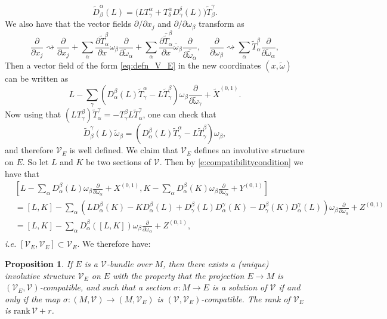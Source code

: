 \documentclass[11pt]{amsart}
\newcommand{\crb}{\mathcal{V}}
\newcommand{\dop}[1]{\frac{\partial}{\partial #1}}
\newcommand{\dopt}[2]{\frac{\partial #1}{\partial #2}}
\theoremstyle{definition}
\theoremstyle{remark}
\theoremstyle{plain}
\newtheorem{prop}[defn]{Proposition}
\begin{document}
%
\[\tilde{D}_\beta^\alpha(L) = \big( LT_\gamma^\alpha + T_\delta^\alpha D_\gamma^{\delta}(L)\big) \tilde{T}_\beta^\gamma.\]
%
We also have that the vector fields $\partial/\partial x_j$ and $\partial/\partial \omega_\beta$ transform as
%
\[\dop{x_j} \rightsquigarrow \dop{x_j}  + \sum_\alpha\dopt{{\tilde T}_{\alpha}^\beta}{x} \omega_\beta \dop{{\tilde \omega}_\alpha} +  \sum_\alpha\dopt{{\bar{\tilde T}}_{\alpha}^\beta}{x} \bar{\omega}_\beta \dop{{\bar{\tilde{\omega}}}_\alpha}, \quad \dop{\omega_\beta} \rightsquigarrow \sum_\alpha {\tilde T}_{\alpha}^\beta \dop{{\tilde \omega}_\alpha}, \]
%
Then a vector field of the form \eqref{eq:defn_V_E} in the new coordinates $(x,\tilde{\omega})$ can be written as
%
\[ L - \sum_\gamma (D_\alpha^\beta(L)\tilde{T}_\gamma^\alpha  -  L \tilde{T}_\gamma^\beta)\omega_\beta \frac{\partial}{\partial \tilde{\omega}_\gamma} + \tilde{X}^{(0,1)}.\]
%
Now using that $(LT_\gamma^\beta)\tilde{T}_\alpha^\gamma = -T_\gamma^\beta L \tilde{T}_\alpha^\gamma$, one can check that 
%
\[ \tilde{D}_\beta^\gamma(L)\tilde{\omega}_\beta = (D_\alpha^\beta(L)\tilde{T}_\gamma^\alpha  -  L \tilde{T}_\gamma^\beta)\omega_\beta,\]
%
and therefore $\mathcal{V}_E$ is well defined. We claim that $\mathcal{V}_E$ defines an involutive structure on $E$. So let $L$ and $K$ be two sections of $\mathcal{V}$. Then by \eqref{e:compatibilitycondition} we have that
%
\[
\begin{aligned}
	&\left[  L - \sum_\alpha D_{ \alpha}^\beta ( L) \omega_\beta \dop{\omega_\alpha} + X^{(0,1) } , 
	K - \sum_\alpha D_{ \alpha}^\beta ( K) \omega_\beta \dop{\omega_\alpha} + Y^{(0,1) } \right] \\ &= [ L,  K] -\sum_\alpha \left(  L D_{ \alpha}^\beta (K) -  K D_{ \alpha}^\beta (L) + D_{\gamma}^\beta (L) D_{\alpha}^\gamma (K) - D_{\gamma}^\beta (K) D_{\alpha}^\gamma (L) \right)\omega_\beta \dop{\omega_\alpha} + Z^{(0,1)} \\
	&=
	[L, K] -\sum_\alpha  D_{ \alpha}^\beta ([L, K]) \omega_\beta \dop{\omega_\alpha} + Z^{(0,1)}, \\
\end{aligned}
\]
%
\textit{i.e.} $[\crb_E, \crb_E ] \subset \crb_E$.
%
We therefore have: 
%
\begin{prop}\label{pro:existenceVE}
%
If $E$ is a $\mathcal{V}$-bundle over $M$, then there 
exists a (unique) involutive structure $\mathcal{V}_E$ on $E$ with the property that the projection 
$E\to M$ is $(\mathcal{V}_E,\mathcal{V})$-compatible, and such that a section $\sigma \colon M \to E$ is 
a solution of $\mathcal{V}$ if and only if the map $\sigma \colon (M,\crb) \to (M,\crb_E)$
is $(\mathcal{V},\mathcal{V}_E)$-compatible. The rank of $\crb_E$ is $\text{rank}\,\mathcal{V} + r$. 
\end{prop}
\end{document}
